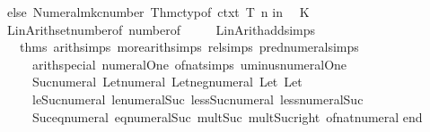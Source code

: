 \begin{isabellebody}
\ \ \ \ else\ Numeral{\isachardot}{\kern0pt}mk{\isacharunderscore}{\kern0pt}cnumber\ {\isacharparenleft}{\kern0pt}Thm{\isachardot}{\kern0pt}ctyp{\isacharunderscore}{\kern0pt}of\ ctxt\ T{\isacharparenright}{\kern0pt}\ n{\isacharsemicolon}{\kern0pt}\isanewline
in\isanewline
\ \ K\ {\isacharparenleft}{\kern0pt}\isanewline
\ \ \ \ Lin{\isacharunderscore}{\kern0pt}Arith{\isachardot}{\kern0pt}set{\isacharunderscore}{\kern0pt}number{\isacharunderscore}{\kern0pt}of\ number{\isacharunderscore}{\kern0pt}of\isanewline
\ \ \ \ {\isacharhash}{\kern0pt}{\isachargreater}{\kern0pt}\ Lin{\isacharunderscore}{\kern0pt}Arith{\isachardot}{\kern0pt}add{\isacharunderscore}{\kern0pt}simps\isanewline
\ \ \ \ \ \ {\isacharat}{\kern0pt}{\isacharbraceleft}{\kern0pt}thms\ arith{\isacharunderscore}{\kern0pt}simps\ more{\isacharunderscore}{\kern0pt}arith{\isacharunderscore}{\kern0pt}simps\ rel{\isacharunderscore}{\kern0pt}simps\ pred{\isacharunderscore}{\kern0pt}numeral{\isacharunderscore}{\kern0pt}simps\isanewline
\ \ \ \ \ \ \ \ arith{\isacharunderscore}{\kern0pt}special\ numeral{\isacharunderscore}{\kern0pt}One\ of{\isacharunderscore}{\kern0pt}nat{\isacharunderscore}{\kern0pt}simps\ uminus{\isacharunderscore}{\kern0pt}numeral{\isacharunderscore}{\kern0pt}One\isanewline
\ \ \ \ \ \ \ \ Suc{\isacharunderscore}{\kern0pt}numeral\ Let{\isacharunderscore}{\kern0pt}numeral\ Let{\isacharunderscore}{\kern0pt}neg{\isacharunderscore}{\kern0pt}numeral\ Let{\isacharunderscore}{\kern0pt}{}\ Let{\isacharunderscore}{\kern0pt}{}\isanewline
\ \ \ \ \ \ \ \ le{\isacharunderscore}{\kern0pt}Suc{\isacharunderscore}{\kern0pt}numeral\ le{\isacharunderscore}{\kern0pt}numeral{\isacharunderscore}{\kern0pt}Suc\ less{\isacharunderscore}{\kern0pt}Suc{\isacharunderscore}{\kern0pt}numeral\ less{\isacharunderscore}{\kern0pt}numeral{\isacharunderscore}{\kern0pt}Suc\isanewline
\ \ \ \ \ \ \ \ Suc{\isacharunderscore}{\kern0pt}eq{\isacharunderscore}{\kern0pt}numeral\ eq{\isacharunderscore}{\kern0pt}numeral{\isacharunderscore}{\kern0pt}Suc\ mult{\isacharunderscore}{\kern0pt}Suc\ mult{\isacharunderscore}{\kern0pt}Suc{\isacharunderscore}{\kern0pt}right\ of{\isacharunderscore}{\kern0pt}nat{\isacharunderscore}{\kern0pt}numeral{\isacharbraceright}{\kern0pt}{\isacharparenright}{\kern0pt}\isanewline
end\isanewline
{\isacartoucheclose}%
\endisatagML
{\isafoldML}%
%
\isadelimML
%
\endisadelimML
%
\isadelimdocument
%
\endisadelimdocument
%
\isatagdocument
%
\isamarkuptrue%
%
\endisatagdocument
{\isafolddocument}%
%
\isadelimdocument

\end{isabellebody}
